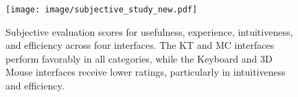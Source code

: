 \begin{figure}[h!]
    \centering
    \texttt{[image: image/subjective\_study\_new.pdf]}
    \caption{Subjective evaluation scores for usefulness, experience, intuitiveness, and efficiency across four interfaces. The KT and MC interfaces perform favorably in all categories, while the Keyboard and 3D Mouse interfaces receive lower ratings, particularly in intuitiveness and efficiency.}
    \label{fig:subjective_study}
\end{figure}